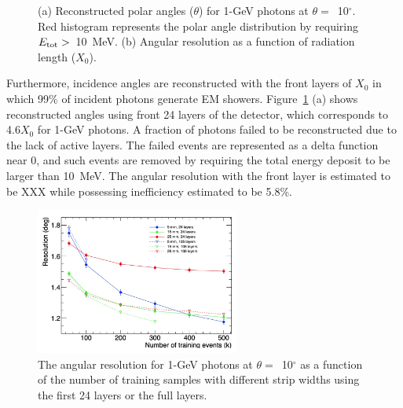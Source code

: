 \documentclass[preprint,12pt,times,a4paper]{elsarticle}
\begin{document}
\begin{figure}[!hbt]
\centering
{}
\caption{ (a) Reconstructed polar angles ($\theta$) for 1-GeV photons at $\theta=$~10$^{\circ}$. Red histogram represents the polar angle distribution by requiring $E_{\rm{tot}}>$~10~MeV. (b) Angular resolution as a function of radiation length ($X_{0}$).}
\label{fig:angle_reco_layer}
\end{figure}

Furthermore, incidence angles are reconstructed with the front layers of $X_{0}$ in which 99\% of incident photons generate EM showers. Figure~\ref{fig:angle_reco_layer} (a) shows reconstructed angles using front 24 layers of the detector, which corresponds to 4.6$X_{0}$ for 1-GeV photons. A fraction of photons failed to be reconstructed due to the lack of active layers. The failed events are represented as a delta function near 0, and such events are removed by requiring the total energy deposit to be larger than 10~MeV. The angular resolution with the front layer is estimated to be XXX while possessing inefficiency estimated to be 5.8\%.

\begin{figure}[!hbt]
\centering
\includegraphics[width=0.6\textwidth]{figures/layer-event.jpg}
\caption{ The angular resolution for 1-GeV photons at $\theta=$~10$^{\circ}$ as a function of the number of training samples with different strip widths using the first 24 layers or the full layers. }
\label{fig:multi-parameter}
\end{figure}
\end{document}
